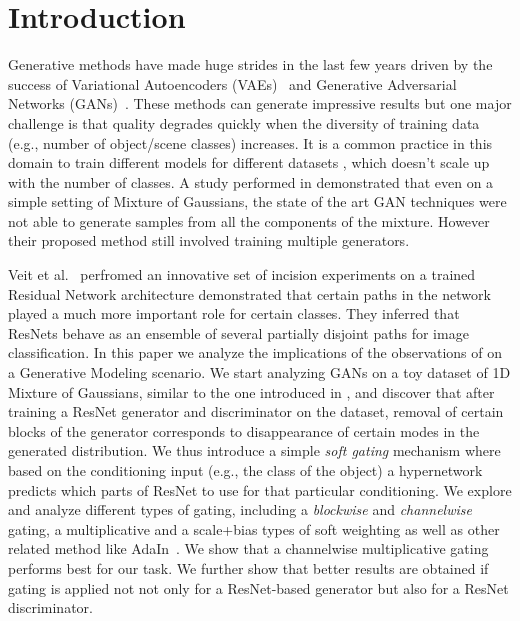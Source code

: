 \section{Introduction}
Generative methods have made huge strides in the last few years driven by the success of Variational Autoencoders (VAEs)~\cite{kingma2013auto} and Generative Adversarial Networks (GANs)~\cite{goodfellow2014generative}. These methods can generate impressive results but one major challenge is that quality degrades quickly when the diversity of training data (e.g., number of object/scene classes) increases. It is a common practice in this domain to train different models for different datasets \cite{goodfellow2014generative,isola2016image2image,progressiveGAN,zhu2017toward,zhu2017unpaired,...,...,...}, which doesn't scale up with the number of classes. A study performed in \cite{ghosh2017multi} demonstrated that even on a simple setting of Mixture of Gaussians, the state of the art GAN techniques were not able to generate samples from all the components of the mixture. However their proposed method still involved training multiple generators.

%
Veit et al.~ perfromed an innovative set of incision experiments on a trained Residual Network architecture \cite{he2016deep} demonstrated that certain paths in the network played a much more important role for certain classes. They inferred that ResNets behave as an ensemble of several partially disjoint paths for image classification. 
In this paper we analyze the implications of the observations of \cite{veit2016residual} on a Generative Modeling scenario. We start analyzing GANs on a toy dataset of 1D Mixture of Gaussians, similar to the one introduced in \cite{ghosh2017multi}, and discover that after training a ResNet generator and discriminator on the dataset, removal of certain blocks of the generator corresponds to disappearance of certain modes in the generated distribution. We thus introduce a simple {\em soft gating} mechanism where based on the conditioning input (e.g., the class of the object) a hypernetwork predicts which parts of ResNet to use for that particular conditioning. We explore and analyze different types of gating, including a {\em blockwise} and {\em channelwise} gating, a multiplicative and a scale+bias types of soft weighting as well as other related method like AdaIn~\cite{huang2017arbitrary,huang2018multimodal}. We show that a channelwise multiplicative gating performs best for our task. We further show that better results are obtained if gating is applied not not only for a ResNet-based generator but also for a ResNet discriminator.
%

